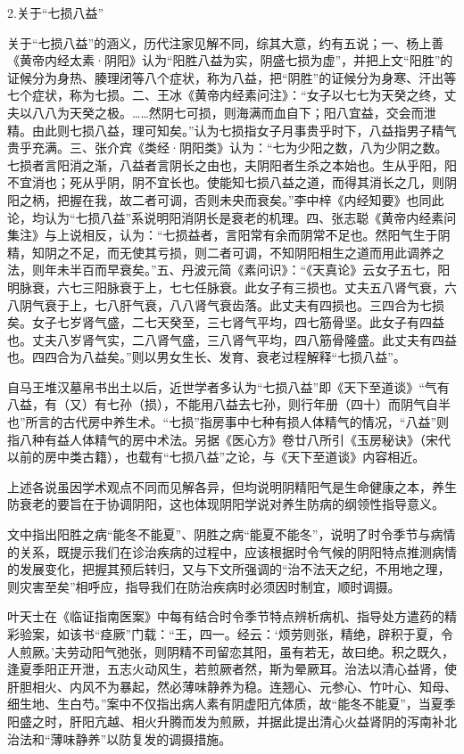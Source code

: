 \documentclass[12pt]{ctexbook}
\begin{document}
2.关于“七损八益”

关于“七损八益”的涵义，历代注家见解不同，综其大意，约有五说；一、杨上善《黄帝内经太素·阴阳》认为“阳胜八益为实，阴盛七损为虚”，并把上文“阳胜”的证候分为身热、腠理闭等八个症状，称为八益，把“阴胜”的证候分为身寒、汗出等七个症状，称为七损。二、王冰《黄帝内经素问注》：“女子以七七为天癸之终，丈夫以八八为天癸之极。……然阴七可损，则海满而血自下；阳八宜益，交会而泄精。由此则七损八益，理可知矣。”认为七损指女子月事贵乎时下，八益指男子精气贵乎充满。三、张介宾《类经·阴阳类》认为：“七为少阳之数，八为少阴之数。七损者言阳消之渐，八益者言阴长之由也，夫阴阳者生杀之本始也。生从乎阳，阳不宜消也；死从乎阴，阴不宜长也。使能知七损八益之道，而得其消长之几，则阴阳之柄，把握在我，故二者可调，否则未央而衰矣。”李中梓《内经知要》也同此论，均认为“七损八益”系说明阳消阴长是衰老的机理。四、张志聪《黄帝内经素问集注》与上说相反，认为：“七损益者，言阳常有余而阴常不足也。然阳气生于阴精，知阴之不足，而无使其亏损，则二者可调，不知阴阳相生之道而用此调养之法，则年未半百而早衰矣。”五、丹波元简《素问识》：“《天真论》云女子五七，阳明脉衰，六七三阳脉衰于上，七七任脉衰。此女子有三损也。丈夫五八肾气衰，六八阴气衰于上，七八肝气衰，八八肾气衰齿落。此丈夫有四损也。三四合为七损矣。女子七岁肾气盛，二七天癸至，三七肾气平均，四七筋骨坚。此女子有四益也。丈夫八岁肾气实，二八肾气盛，三八肾气平均，四八筋骨隆盛。此丈夫有四益也。四四合为八益矣。”则以男女生长、发育、衰老过程解释“七损八益”。

自马王堆汉墓帛书出土以后，近世学者多认为“七损八益”即《天下至道谈》“气有八益，有（又）有七孙（损），不能用八益去七孙，则行年册（四十）而阴气自半也”所言的古代房中养生术。“七损”指房事中七种有损人体精气的情况，“八益”则指八种有益人体精气的房中术法。另据《医心方》卷廿八所引《玉房秘诀》（宋代以前的房中类古籍），也载有“七损八益”之论，与《天下至道谈》内容相近。

上述各说虽因学术观点不同而见解各异，但均说明阴精阳气是生命健康之本，养生防衰老的要旨在于协调阴阳，这也体现阴阳学说对养生防病的纲领性指导意义。



文中指出阳胜之病“能冬不能夏”、阴胜之病“能夏不能冬”，说明了时令季节与病情的关系，既提示我们在诊治疾病的过程中，应该根据时令气候的阴阳特点推测病情的发展变化，把握其预后转归，又与下文所强调的“治不法天之纪，不用地之理，则灾害至矣”相呼应，指导我们在防治疾病时必须因时制宜，顺时调摄。

叶天士在《临证指南医案》中每有结合时令季节特点辨析病机、指导处方遣药的精彩验案，如该书“痉厥”门载：“王，四一。经云：‘烦劳则张，精绝，辟积于夏，令人煎厥。’夫劳动阳气弛张，则阴精不司留恋其阳，虽有若无，故曰绝。积之既久，逢夏季阳正开泄，五志火动风生，若煎厥者然，斯为晕厥耳。治法以清心益肾，使肝胆相火、内风不为暴起，然必薄味静养为稳。连翘心、元参心、竹叶心、知母、细生地、生白芍。”案中不仅指出病人素有阴虚阳亢体质，故“能冬不能夏”，当夏季阳盛之时，肝阳亢越、相火升腾而发为煎厥，并据此提出清心火益肾阴的泻南补北治法和“薄味静养”以防复发的调摄措施。
\end{document}

